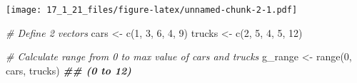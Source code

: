 \documentclass[
]{article}
\newenvironment{Shaded}{\begin{snugshade}}{\end{snugshade}}
\newcommand{\CommentTok}[1]{\textcolor[rgb]{0.56,0.35,0.01}{\textit{#1}}}
\newcommand{\DecValTok}[1]{\textcolor[rgb]{0.00,0.00,0.81}{#1}}
\newcommand{\DocumentationTok}[1]{\textcolor[rgb]{0.56,0.35,0.01}{\textbf{\textit{#1}}}}
\newcommand{\FunctionTok}[1]{\textcolor[rgb]{0.00,0.00,0.00}{#1}}
\newcommand{\NormalTok}[1]{#1}
\newcommand{\OtherTok}[1]{\textcolor[rgb]{0.56,0.35,0.01}{#1}}
\begin{document}
\texttt{[image: 17\_1\_21\_files/figure-latex/unnamed-chunk-2-1.pdf]}

\begin{Shaded}
\begin{Highlighting}[]
\CommentTok{\# Define 2 vectors}
\NormalTok{cars }\OtherTok{\textless{}{-}} \FunctionTok{c}\NormalTok{(}\DecValTok{1}\NormalTok{, }\DecValTok{3}\NormalTok{, }\DecValTok{6}\NormalTok{, }\DecValTok{4}\NormalTok{, }\DecValTok{9}\NormalTok{)}
\NormalTok{trucks }\OtherTok{\textless{}{-}} \FunctionTok{c}\NormalTok{(}\DecValTok{2}\NormalTok{, }\DecValTok{5}\NormalTok{, }\DecValTok{4}\NormalTok{, }\DecValTok{5}\NormalTok{, }\DecValTok{12}\NormalTok{)}

\CommentTok{\# Calculate range from 0 to max value of cars and trucks}
\NormalTok{g\_range }\OtherTok{\textless{}{-}} \FunctionTok{range}\NormalTok{(}\DecValTok{0}\NormalTok{, cars, trucks) }\DocumentationTok{\#\# (0 to 12)}
\end{Highlighting}
\end{Shaded}
\end{document}
